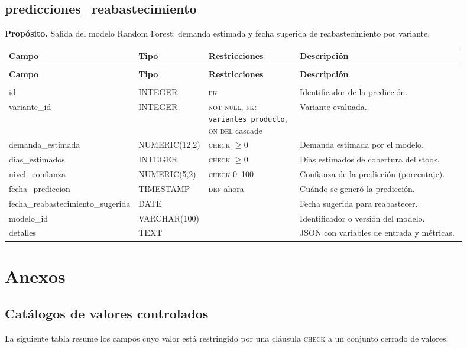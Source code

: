 \documentclass[11pt]{article}
\makeatletter
\newenvironment{campos}{%
  \par\footnotesize
  \setlength{\LTpre}{0.3ex}\setlength{\LTpost}{0.6ex}
  \begin{longtable}{@{}>{\ttfamily}p{0.165\linewidth} >{\ttfamily}p{0.150\linewidth} p{0.205\linewidth} >{\raggedright\arraybackslash}p{0.385\linewidth}@{}}
  \toprule
  \normalfont\bfseries Campo & \normalfont\bfseries Tipo & \normalfont\bfseries Restricciones & \normalfont\bfseries Descripción \\
  \midrule \endfirsthead
  \multicolumn{4}{@{}l}{\footnotesize\itshape \dots\ continuación}\\[0.3ex]
  \toprule
  \normalfont\bfseries Campo & \normalfont\bfseries Tipo & \normalfont\bfseries Restricciones & \normalfont\bfseries Descripción \\
  \midrule \endhead
  \midrule \multicolumn{4}{r@{}}{\footnotesize\itshape continúa en la siguiente página}\\ \endfoot
  \bottomrule \endlastfoot
}{%
  \end{longtable}\par
}
\newcommand{\proposito}[1]{\par\vspace{0.2ex}\noindent\colorbox{brandlight}{\parbox{\dimexpr\linewidth-2\fboxsep}{\small\textbf{Propósito.} #1}}\par\vspace{0.8ex}}
\newcommand{\pk}{\textsc{pk}}
\newcommand{\fk}[1]{\textsc{fk}: \texttt{#1}}
\newcommand{\nn}{\textsc{not null}}
\makeatother
\begin{document}
\subsection{predicciones\_reabastecimiento}
\proposito{Salida del modelo Random Forest: demanda estimada y fecha sugerida de reabastecimiento por variante.}
\begin{campos}
id                              & INTEGER       & \pk{}   & Identificador de la predicción. \\
variante\_id                    & INTEGER       & \nn, \fk{variantes\_producto}, \textsc{on del} cascade & Variante evaluada. \\
demanda\_estimada               & NUMERIC(12,2) & \textsc{check} $\geq 0$ & Demanda estimada por el modelo. \\
dias\_estimados                 & INTEGER       & \textsc{check} $\geq 0$ & Días estimados de cobertura del stock. \\
nivel\_confianza                & NUMERIC(5,2)  & \textsc{check} 0--100 & Confianza de la predicción (porcentaje). \\
fecha\_prediccion               & TIMESTAMP     & \textsc{def} ahora & Cuándo se generó la predicción. \\
fecha\_reabastecimiento\_sugerida & DATE        &         & Fecha sugerida para reabastecer. \\
modelo\_id                      & VARCHAR(100)  &         & Identificador o versión del modelo. \\
detalles                        & TEXT          &         & JSON con variables de entrada y métricas. \\
\end{campos}

\section{Anexos}

\subsection{Catálogos de valores controlados}
La siguiente tabla resume los campos cuyo valor está restringido por una
cláusula \textsc{check} a un conjunto cerrado de valores.
\end{document}
